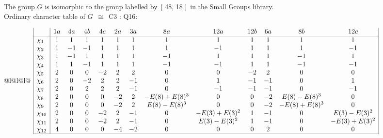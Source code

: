 \documentclass[varwidth=\maxdimen,border=10]{standalone}
\begin{document}
The group $G$ is isomorphic to the group labelled by\ [ 48, 18 ]\ in the Small Groups library.\\
Ordinary character table of $G$\ $\cong$\ C3 : Q16:\\
\begin{center}
\begin{tabular}{@{}l@{}l@{}l@{}}
\hline
\(\begin{array}{|l|cccccccccccc|}
  & 1a & 4a & 4b & 4c & 2a & 3a & 8a & 12a & 12b & 6a & 8b & 12c\\ \hline
\chi_{1} & 1 & 1 & 1 & 1 & 1 & 1 & 1 & 1 & 1 & 1 & 1 & 1\\
\chi_{2} & 1 & -1 & -1 & 1 & 1 & 1 & 1 & -1 & 1 & 1 & 1 & -1\\
\chi_{3} & 1 & -1 & 1 & 1 & 1 & 1 & -1 & 1 & 1 & 1 & -1 & 1\\
\chi_{4} & 1 & 1 & -1 & 1 & 1 & 1 & -1 & -1 & 1 & 1 & -1 & -1\\
\chi_{5} & 2 & 0 & 0 & -2 & 2 & 2 & 0 & 0 & -2 & 2 & 0 & 0\\
\chi_{6} & 2 & 0 & -2 & 2 & 2 & -1 & 0 & 1 & -1 & -1 & 0 & 1\\
\chi_{7} & 2 & 0 & 2 & 2 & 2 & -1 & 0 & -1 & -1 & -1 & 0 & -1\\
\chi_{8} & 2 & 0 & 0 & 0 & -2 & 2 & -E(8)+E(8)^{3} & 0 & 0 & -2 & E(8)-E(8)^{3} & 0\\
\chi_{9} & 2 & 0 & 0 & 0 & -2 & 2 & E(8)-E(8)^{3} & 0 & 0 & -2 & -E(8)+E(8)^{3} & 0\\
\chi_{10} & 2 & 0 & 0 & -2 & 2 & -1 & 0 & -E(3)+E(3)^{2} & 1 & -1 & 0 & E(3)-E(3)^{2}\\
\chi_{11} & 2 & 0 & 0 & -2 & 2 & -1 & 0 & E(3)-E(3)^{2} & 1 & -1 & 0 & -E(3)+E(3)^{2}\\
\chi_{12} & 4 & 0 & 0 & 0 & -4 & -2 & 0 & 0 & 0 & 2 & 0 & 0\\
\hline
\end{array}\)\\
\end{tabular}
\end{center}
\end{document}

